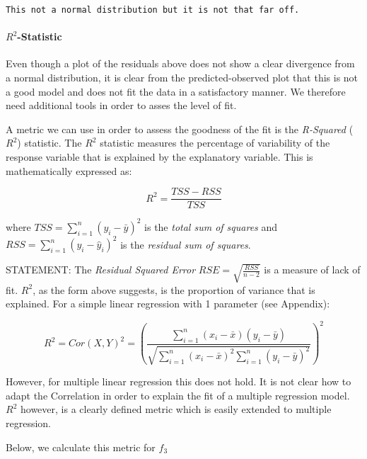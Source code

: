 \documentclass[11pt]{article}
\begin{document}
    \begin{Verbatim}[commandchars=\\\{\}]
This not a normal distribution but it is not that far off.

    \end{Verbatim}

    \paragraph{\texorpdfstring{\(R^2\)-Statistic}{R\^{}2-Statistic}}\label{r2-statistic}

Even though a plot of the residuals above does not show a clear
divergence from a normal distribution, it is clear from the
predicted-observed plot that this is not a good model and does not fit
the data in a satisfactory manner. We therefore need additional tools in
order to asses the level of fit.

A metric we can use in order to assess the goodness of the fit is the
\emph{R-Squared} (\(R^2\)) statistic. The \(R^2\) statistic measures the
percentage of variability of the response variable that is explained by
the explanatory variable. This is mathematically expressed as:

\[R^2 = \frac{TSS-RSS}{TSS}\]

where \(TSS = \sum_{i=1}^n(y_i - \bar{y})^2\) is the \emph{total sum of
squares} and \(RSS = \sum_{i=1}^n (y_i - \hat{y}_i)^2\) is the
\emph{residual sum of squares}.

STATEMENT: The \emph{Residual Squared Error}
\(RSE=\sqrt{ \frac{ RSS }{ n-2 } }\) is a measure of lack of fit.
\(R^2\), as the form above suggests, is the proportion of variance that
is explained. For a simple linear regression with 1 parameter (see
Appendix):

\[R^2 = Cor(X,Y)^2 = \left( \frac{ \sum_{i=1}^n (x_i - \bar{x})(y_i - \bar{y}) }{ \sqrt{ \sum_{i=1}^n (x_i - \bar{x})^2 \sum_{i=1}^n (y_i - \bar{y})^2 } } \right) ^2\]

However, for multiple linear regression this does not hold. It is not
clear how to adapt the Correlation in order to explain the fit of a
multiple regression model. \(R^2\) however, is a clearly defined metric
which is easily extended to multiple regression.

Below, we calculate this metric for \(f_3\)
\end{document}
